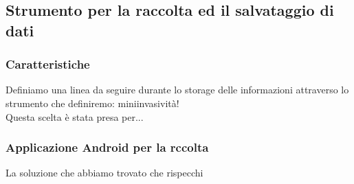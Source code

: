 \documentclass[a4paper]{article}
\begin{document}
	\subsection{Strumento per la raccolta ed il salvataggio di dati}

	\subsubsection{Caratteristiche}
Definiamo una linea da seguire durante lo storage delle informazioni attraverso lo strumento che definiremo: miniinvasività! \\
Questa scelta è stata presa per...
 
	\subsubsection{Applicazione Android per la rccolta}
La soluzione che abbiamo trovato che rispecchi 
\end{document}
